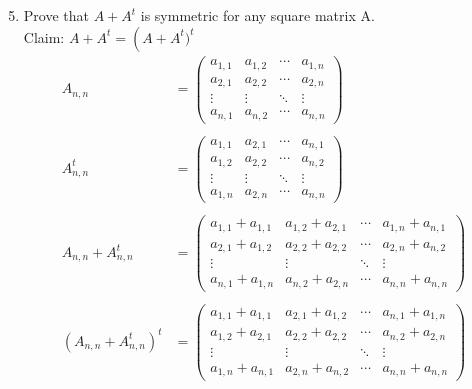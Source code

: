 \documentclass[letterpaper,12pt]{article}
\newcommand{\?}{\stackrel{?}{=}}
\begin{document}
\begin{spacing}{1.5}
\subsection{}
\begin{enumerate}
\setcounter{enumi}{4}
\item Prove that $A + A^t$ is symmetric for any square matrix A. 
\\
Claim: $A+A^t = \left(A + A^t)^t$
\begin{align*}
 A_{n,n} &=
 \begin{pmatrix}
  a_{1,1} & a_{1,2} & \cdots & a_{1,n} \\
  a_{2,1} & a_{2,2} & \cdots & a_{2,n} \\
  \vdots  & \vdots  & \ddots & \vdots  \\
  a_{n,1} & a_{n,2} & \cdots & a_{n,n}
 \end{pmatrix}
\\
\\ A^t_{n,n} &=
 \begin{pmatrix}
  a_{1,1} & a_{2,1} & \cdots & a_{n,1} \\
  a_{1,2} & a_{2,2} & \cdots & a_{n,2} \\
  \vdots  & \vdots  & \ddots & \vdots  \\
  a_{1,n} & a_{2,n} & \cdots & a_{n,n}
 \end{pmatrix}
\\
 \\A_{n,n} + A^t_{n,n} &=
 \begin{pmatrix}
  a_{1,1}+a_{1,1} & a_{1,2} + a_{2,1} & \cdots & a_{1,n} + a_{n,1} \\
  a_{2,1} + a_{1,2} & a_{2,2} + a_{2,2} & \cdots & a_{2,n} + a_{n,2}  \\
  \vdots  & \vdots  & \ddots & \vdots  \\
  a_{n,1} + a_{1,n}  & a_{n,2} + a_{2,n} & \cdots & a_{n,n} + a_{n,n}
 \end{pmatrix}
\\
\\ \left(A_{n,n} + A^t_{n,n}\right)^t &=
 \begin{pmatrix}
  a_{1,1}+a_{1,1} & a_{2,1} + a_{1,2} & \cdots & a_{n,1} + a_{1,n} \\
  a_{1,2} + a_{2,1} & a_{2,2} + a_{2,2} & \cdots & a_{n,2} + a_{2,n}  \\
  \vdots  & \vdots  & \ddots & \vdots  \\
  a_{1,n} + a_{n,1}  & a_{2,n} + a_{n,2} & \cdots & a_{n,n} + a_{n,n}
 \end{pmatrix}

\end{align*}
\end{enumerate}
\end{spacing}
\end{document}
